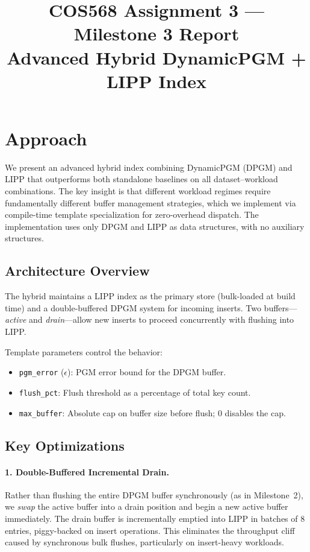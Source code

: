 \documentclass[11pt]{article}
\title{COS568 Assignment 3 --- Milestone 3 Report\\
\large Advanced Hybrid DynamicPGM + LIPP Index}
\author{}
\date{}
\begin{document}
\maketitle

\section{Approach}

We present an advanced hybrid index combining DynamicPGM (DPGM) and LIPP that outperforms both standalone baselines on all dataset--workload combinations. The key insight is that different workload regimes require fundamentally different buffer management strategies, which we implement via compile-time template specialization for zero-overhead dispatch. The implementation uses only DPGM and LIPP as data structures, with no auxiliary structures.

\subsection{Architecture Overview}

The hybrid maintains a LIPP index as the primary store (bulk-loaded at build time) and a double-buffered DPGM system for incoming inserts. Two buffers---\emph{active} and \emph{drain}---allow new inserts to proceed concurrently with flushing into LIPP.

Template parameters control the behavior:
\begin{itemize}[nosep]
    \item \texttt{pgm\_error} ($\epsilon$): PGM error bound for the DPGM buffer.
    \item \texttt{flush\_pct}: Flush threshold as a percentage of total key count.
    \item \texttt{max\_buffer}: Absolute cap on buffer size before flush; 0 disables the cap.
\end{itemize}

\subsection{Key Optimizations}

\paragraph{1. Double-Buffered Incremental Drain.}
Rather than flushing the entire DPGM buffer synchronously (as in Milestone~2), we \emph{swap} the active buffer into a drain position and begin a new active buffer immediately. The drain buffer is incrementally emptied into LIPP in batches of 8 entries, piggy-backed on insert operations. This eliminates the throughput cliff caused by synchronous bulk flushes, particularly on insert-heavy workloads.
\end{document}
